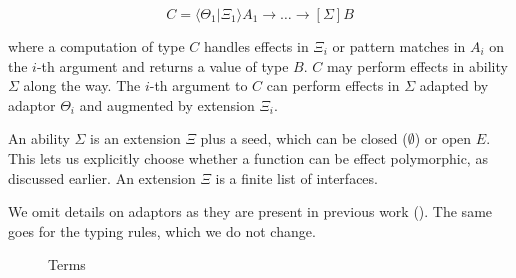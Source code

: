 \documentclass[msc,deptreport,cs]{infthesis} %
\makeatletter
\newcommand\figscale{0.9}
\newcommand{\many}{\overline}
\newcommand\ba{\begin{array}}
\newcommand\ea{\end{array}}
\newenvironment{syntax}{\[\ba{@{}l@{~}r@{~}c@{~}l@{}}}{\ea\]\ignorespacesafterend}
\newcommand{\adapt}{\Theta}
\newcommand{\ext}{\Xi}
\newcommand{\sigs}{\Sigma}
\newcommand{\key}[1]{\mathbf{#1}} %
\newcommand{\handleSymbol}{\rightarrow}
\newcommand{\handle}[2]{{#1} \handleSymbol {#2}}
\newcommand{\thunk}[1]{\{{#1}\}}
\newcommand\slab[1]{(\textrm{#1})}
\newcommand{\ev}{E}
\newcommand{\effin}[1]{\langle {#1} \rangle}
\newcommand{\effout}[1]{[{#1}]}
\newcommand{\nowt}{\emptyset}
\newcommand{\uc}{\mathord{\downarrow}}
\newcommand{\cu}{\mathord{\uparrow}}
\newcommand{\gor}{\mid}
\newcommand{\pipe}{\texttt{|}}
\makeatother
\begin{document}
\[
  C = \effin{\adapt_1\pipe\ext_1}A_1 \to \dots \to \effout{\sigs} B
\]

\noindent where a computation of type $C$ handles effects in $\ext_i$ or pattern
matches in $A_i$ on the $i$-th argument and returns a value of type $B$. $C$ may
perform effects in ability $\sigs$ along the way.
%
The $i$-th argument to $C$ can perform effects in $\sigs$ adapted by adaptor
$\adapt_i$ and augmented by extension $\ext_i$.

An ability $\sigs$ is an extension $\ext$ plus a seed, which can be closed
($\nowt$) or open $\ev$. This lets us explicitly choose whether a function can
be effect polymorphic, as discussed earlier. An extension $\ext$ is a finite
list of interfaces.


We omit details on adaptors as they are present in previous work
(\cite{convent2020doo}). The same goes for the typing rules, which we do not
change.

\begin{figure} %
\centering
\scalebox{\figscale}{%
\begin{syntax}
  \slab{constructors}               & k \\
  \slab{commands}                   & c \\
  \slab{uses}                 & m      &::= &
     x \gor f~\many{R} \gor m~\many{n} \gor \cu(n:A) \\
  \slab{constructions}        & n      &::= &
    \uc m \gor k~\many{n} \gor c~\many{R}~\many{n} \gor \thunk{e} \\
                              &        &\gor& \key{let}~f : P = n~\key{in}~n'
                                   \gor
                                   \key{letrec}~\many{f : P = e}~\key{in}~n \\
                              &        &\gor&  \effin{\adapt}~n \\
  \slab{computations}         & e      &::=& \many{\many{r} \mapsto n}
  \\
  \slab{computation patterns} & r      &::=& p
                                        \gor \effin{\handle{c~\many{p}\,}{z}}
                                        \gor \effin{x} \\
  \slab{value patterns}       & p      &::=& k~\many{p} \gor x        \\
\end{syntax}
}
\caption{Terms}
\label{fig:terms}
\end{figure}
\end{document}
